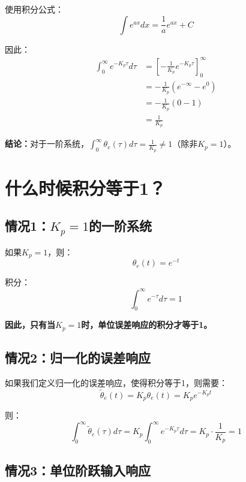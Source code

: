 \documentclass[12pt,a4paper]{article}
\begin{document}
使用积分公式：
\begin{equation}
\int e^{ax} dx = \frac{1}{a} e^{ax} + C
\end{equation}

因此：
\begin{align}
\int_0^{\infty} e^{-K_p \tau} d\tau &= \left[-\frac{1}{K_p} e^{-K_p \tau}\right]_0^{\infty} \\
&= -\frac{1}{K_p} \left(e^{-\infty} - e^{0}\right) \\
&= -\frac{1}{K_p} (0 - 1) \\
&= \frac{1}{K_p}
\end{align}

\textbf{结论：}对于一阶系统，$\int_0^{\infty} \theta_e(\tau) d\tau = \frac{1}{K_p} \neq 1$（除非$K_p = 1$）。

\section{什么时候积分等于1？}

\subsection{情况1：$K_p = 1$的一阶系统}

如果$K_p = 1$，则：
\begin{equation}
\theta_e(t) = e^{-t}
\end{equation}

积分：
\begin{equation}
\int_0^{\infty} e^{-\tau} d\tau = 1
\end{equation}

\textbf{因此，只有当$K_p = 1$时，单位误差响应的积分才等于1。}

\subsection{情况2：归一化的误差响应}

如果我们定义归一化的误差响应，使得积分等于1，则需要：
\begin{equation}
\tilde{\theta}_e(t) = K_p \theta_e(t) = K_p e^{-K_p t}
\end{equation}

则：
\begin{equation}
\int_0^{\infty} \tilde{\theta}_e(\tau) d\tau = K_p \int_0^{\infty} e^{-K_p \tau} d\tau = K_p \cdot \frac{1}{K_p} = 1
\end{equation}

\subsection{情况3：单位阶跃输入响应}
\end{document}
